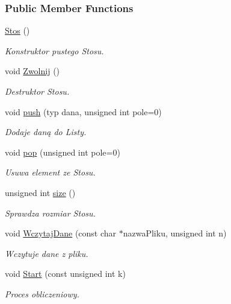 \subsubsection*{Public Member Functions}
\begin{DoxyCompactItemize}
\item 
\hyperlink{class_stos_afc525fb8a9f8f80fda9bf0f846c078c4}{Stos} ()
\begin{DoxyCompactList}\small\item\em Konstruktor pustego Stosu. \end{DoxyCompactList}\item 
void \hyperlink{class_stos_a1cfa859cdeddb64a9b49ec7526c5ac5a}{Zwolnij} ()
\begin{DoxyCompactList}\small\item\em Destruktor Stosu. \end{DoxyCompactList}\item 
void \hyperlink{class_stos_aa365a8b36117a4ebc99236de643a3354}{push} (typ dana, unsigned int pole=0)
\begin{DoxyCompactList}\small\item\em Dodaje daną do Listy. \end{DoxyCompactList}\item 
void \hyperlink{class_stos_ab18e88e29805390208e6587e7858ced1}{pop} (unsigned int pole=0)
\begin{DoxyCompactList}\small\item\em Usuwa element ze Stosu. \end{DoxyCompactList}\item 
unsigned int \hyperlink{class_stos_aea130eb6d93369ac9f8cc5936509a4c1}{size} ()
\begin{DoxyCompactList}\small\item\em Sprawdza rozmiar Stosu. \end{DoxyCompactList}\item 
void \hyperlink{class_stos_aacdee7eebeb5f142f1418fee04253ef3}{Wczytaj\-Dane} (const char $\ast$nazwa\-Pliku, unsigned int n)
\begin{DoxyCompactList}\small\item\em Wczytuje dane z pliku. \end{DoxyCompactList}\item 
void \hyperlink{class_stos_a226985a6573d2f5d82e3813be6c3ccf5}{Start} (const unsigned int k)
\begin{DoxyCompactList}\small\item\em Proces obliczeniowy. \end{DoxyCompactList}\end{DoxyCompactItemize}
